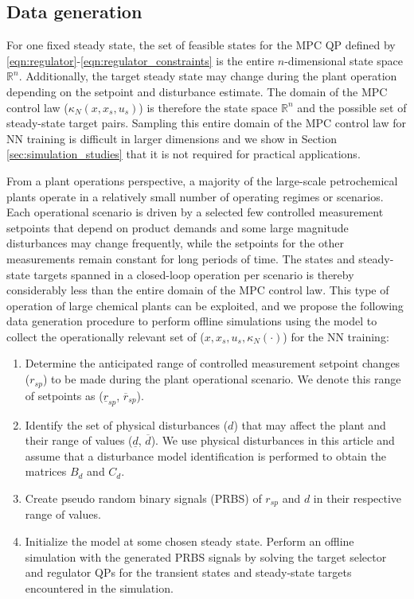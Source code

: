 \documentclass[preprint,5p, twocolumn, authoryear]{elsarticle}
\newcommand{\bbR}{\mathbb{R}}
\begin{document}
\subsection{Data generation}

For one fixed steady state, the 
set of feasible states for the MPC QP 
defined by \eqref{eqn:regulator}-\eqref{eqn:regulator_constraints}
is the entire $n$-dimensional state space $\bbR^n$.
Additionally, the target steady state may change
during the plant operation depending
on the setpoint and disturbance estimate. 
The domain of the MPC control law ($\kappa_N(x, x_s, u_s)$)
is therefore the state space 
$\bbR^{n}$ and the possible set of steady-state 
target pairs. Sampling this entire domain of the
MPC control law for NN training is difficult in larger 
dimensions and we show in Section 
\ref{sec:simulation_studies} that it is
not required for practical applications. 

From a plant operations perspective,
a majority of the large-scale petrochemical plants
operate in a relatively small number of operating regimes
or scenarios. Each operational scenario is driven 
by a selected few controlled measurement 
setpoints that depend on product demands
and some large magnitude disturbances
may change frequently, 
while the setpoints for 
the other measurements remain constant for long periods 
of time. The states and steady-state targets 
spanned in a closed-loop 
operation per scenario is thereby considerably less 
than the entire domain of the MPC control law.
This type of operation of large chemical plants
can be exploited, and we propose the 
following data generation procedure 
to perform offline simulations using the model to 
collect the operationally 
relevant set of ($x, x_s, u_s, \kappa_N(\cdot)$) 
for the NN training:

\begin{enumerate}
    \item Determine the anticipated range of 
    controlled measurement setpoint changes ($r_{sp}$)
    to be made during the plant operational 
    scenario. We denote 
    this range of setpoints as ($\underline{r}_{sp}$, $\overline{r}_{sp}$).
    \item Identify the set of physical disturbances ($d$) 
    that may affect the plant and their range of values 
    ($\underline{d}$, $\overline{d}$). We use 
    physical disturbances in this article and assume that 
    a disturbance model identification is performed 
    to obtain the matrices $B_d$ and $C_d$.
    \item Create pseudo random binary signals (PRBS)
    of $r_{sp}$ and $d$ in their respective range of values.
    \item Initialize the model at some chosen steady state.
    Perform an offline simulation with the 
    generated PRBS signals by solving the target
    selector and regulator QPs for the transient states
    and steady-state targets encountered in the simulation. 
\end{enumerate}
\end{document}
